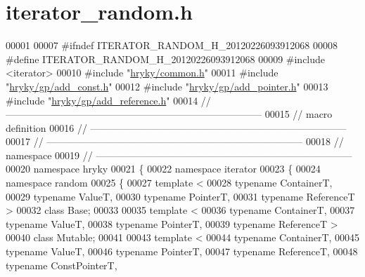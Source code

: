 \hypertarget{iterator__random_8h_source}{\section{iterator\-\_\-random.\-h}
}

\begin{DoxyCode}
00001 
00007 \textcolor{preprocessor}{#ifndef ITERATOR\_RANDOM\_H\_20120226093912068}
00008 \textcolor{preprocessor}{}\textcolor{preprocessor}{#define ITERATOR\_RANDOM\_H\_20120226093912068}
00009 \textcolor{preprocessor}{}\textcolor{preprocessor}{#include <iterator>}
00010 \textcolor{preprocessor}{#include "\hyperlink{common_8h}{hryky/common.h}"}
00011 \textcolor{preprocessor}{#include "\hyperlink{add__const_8h}{hryky/gp/add_const.h}"}
00012 \textcolor{preprocessor}{#include "\hyperlink{add__pointer_8h}{hryky/gp/add_pointer.h}"}
00013 \textcolor{preprocessor}{#include "\hyperlink{add__reference_8h}{hryky/gp/add_reference.h}"}
00014 \textcolor{comment}{//
      ------------------------------------------------------------------------------}
00015 \textcolor{comment}{// macro definition}
00016 \textcolor{comment}{//
      ------------------------------------------------------------------------------}
00017 \textcolor{comment}{//
      ------------------------------------------------------------------------------}
00018 \textcolor{comment}{// namespace}
00019 \textcolor{comment}{//
      ------------------------------------------------------------------------------}
00020 \textcolor{keyword}{namespace }hryky
00021 \{
00022 \textcolor{keyword}{namespace }iterator
00023 \{
00024 \textcolor{keyword}{namespace }random
00025 \{
00027     \textcolor{keyword}{template} <
00028         \textcolor{keyword}{typename} ContainerT,
00029         \textcolor{keyword}{typename} ValueT,
00030         \textcolor{keyword}{typename} PointerT,
00031         \textcolor{keyword}{typename} ReferenceT >
00032     \textcolor{keyword}{class }Base;
00033     
00035     \textcolor{keyword}{template} <
00036         \textcolor{keyword}{typename} ContainerT,
00037         \textcolor{keyword}{typename} ValueT,
00038         \textcolor{keyword}{typename} PointerT,
00039         \textcolor{keyword}{typename} ReferenceT >
00040     \textcolor{keyword}{class }Mutable;
00041     
00043     \textcolor{keyword}{template} <
00044         \textcolor{keyword}{typename} ContainerT,
00045         \textcolor{keyword}{typename} ValueT,
00046         \textcolor{keyword}{typename} PointerT,
00047         \textcolor{keyword}{typename} ReferenceT,
00048         \textcolor{keyword}{typename} ConstPointerT,

\end{DoxyCode}
